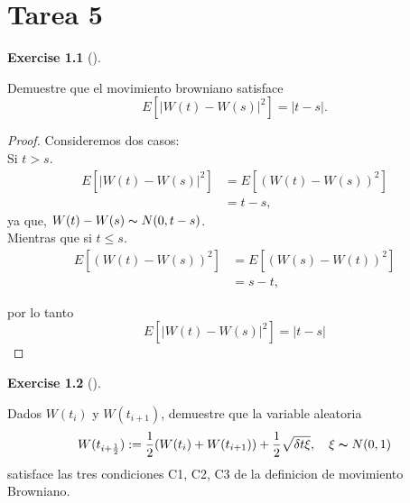 \documentclass[
  letterpaper,
  DIV=11,
  numbers=noendperiod]{scrreprt}
\theoremstyle{plain}
\theoremstyle{definition}
\newtheorem{exercise}{Exercise}[chapter]
\theoremstyle{remark}
\begin{document}

\hypertarget{tarea-5}{%
\chapter{Tarea 5}\label{tarea-5}}

\begin{exercise}[]\protect\hypertarget{exr-1}{}\label{exr-1}

Demuestre que el movimiento browniano satisface \[
E[|W(t)-W(s)|^{2}]=|t-s|.
\]

\end{exercise}

\begin{proof}

Consideremos dos casos:\\
Si \(t>s\). \[
\begin{align*}
E\left[\left|W\left(t\right)-W\left(s\right)\right|^{2}\right] & =E\left[\left(W\left(t\right)-W\left(s\right)\right)^{2}\right]\\
 & =t-s,
\end{align*}
\] ya que, \(W(t)-W(s)\thicksim N(0,t-s)\).\\
Mientras que si \(t\leq s\). \[
\begin{align*}
E\left[\left(W\left(t\right)-W\left(s\right)\right)^{2}\right] & =E\left[\left(W\left(s\right)-W\left(t\right)\right)^{2}\right]\\
 & =s-t,
\end{align*}
\]

por lo tanto \[
E\left[\left|W\left(t\right)-W\left(s\right)\right|^{2}\right]=\left|t-s\right|
\]

\end{proof}

\begin{exercise}[]\protect\hypertarget{exr-2}{}\label{exr-2}

Dados \(W(t_{i})\) y \(W(t_{i+1})\), demuestre que la variable aleatoria
\[
W(t_{i+\frac{1}{2}}):=\frac{1}{2}(W(t_{i})+W(t_{i+1}))+\frac{1}{2}\sqrt{\delta t\xi},\quad\xi\thicksim N(0,1)
\] satisface las tres condiciones C1, C2, C3 de la definicion de
movimiento Browniano.

\end{exercise}
\end{document}
